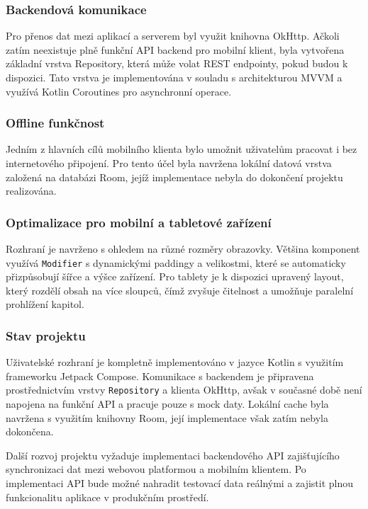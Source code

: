 \documentclass[12pt]{article}
\begin{document}
\subsubsection{Backendová komunikace}

Pro přenos dat mezi aplikací a serverem byl využit knihovna OkHttp.
Ačkoli zatím neexistuje plně funkční API backend pro mobilní klient, byla vytvořena základní vrstva Repository, která může volat REST endpointy, pokud budou k dispozici.
Tato vrstva je implementována v souladu s architekturou MVVM a využívá Kotlin Coroutines pro asynchronní operace.

\subsubsection{Offline funkčnost}

Jedním z hlavních cílů mobilního klienta bylo umožnit uživatelům pracovat i bez internetového připojení.
Pro tento účel byla navržena lokální datová vrstva založená na databázi Room, jejíž implementace nebyla do dokončení projektu realizována.

\subsubsection{Optimalizace pro mobilní a tabletové zařízení}

Rozhraní je navrženo s ohledem na různé rozměry obrazovky. Většina komponent využívá \texttt{Modifier} s dynamickými paddingy a velikostmi, které se automaticky přizpůsobují šířce a výšce zařízení.
Pro tablety je k dispozici upravený layout, který rozdělí obsah na více sloupců, čímž zvyšuje čitelnost a umožňuje paralelní prohlížení kapitol.

\subsubsection{Stav projektu}

Uživatelské rozhraní je kompletně implementováno v jazyce Kotlin s využitím frameworku Jetpack Compose.
Komunikace s backendem je připravena prostřednictvím vrstvy \texttt{Repository} a klienta OkHttp, avšak v současné době není napojena na funkční API a pracuje pouze s mock daty.
Lokální cache byla navržena s využitím knihovny Room, její implementace však zatím nebyla dokončena.

Další rozvoj projektu vyžaduje implementaci backendového API zajišťujícího synchronizaci dat mezi webovou platformou a mobilním klientem.
Po implementaci API bude možné nahradit testovací data reálnými a zajistit plnou funkcionalitu aplikace v produkčním prostředí.
\end{document}
